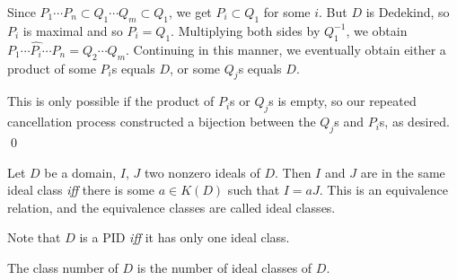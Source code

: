 Since $P_1\dotsm P_n\subset Q_1\dotsm Q_m\subset Q_1$, we get $P_i\subset Q_1$ for some $i$.  But $D$ is Dedekind, so $P_i$ is maximal and so $P_i=Q_1$.  Multiplying both sides by $Q_1^{-1}$, we obtain $P_1\dotsm\hat{P_i}\dotsm P_n=Q_2\dotsm Q_m$.  Continuing in this manner, we eventually obtain either a product of some $P_i$s equals $D$, or some $Q_j$s equals $D$.

This is only possible if the product of $P_i$s or $Q_j$s is empty, so our repeated cancellation process constructed a bijection between the $Q_j$s and $P_i$s, as desired. \qed

 Let $D$ be a domain, $I$, $J$ two nonzero ideals of $D$.  Then $I$ and $J$ are in the same ideal class \emph{iff} there is some $a\in K(D)$ such that $I=aJ$.  This is an equivalence relation, and the equivalence classes are called ideal classes.

Note that $D$ is a PID \emph{iff} it has only one ideal class. %

 The class number of $D$ is the number of ideal classes of $D$.

